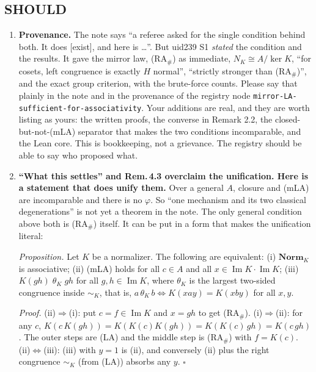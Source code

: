 \documentclass[11pt]{article}
\newcommand{\Norm}{\mathbf{Norm}}
\renewcommand{\Im}{\operatorname{Im}}
\begin{document}
\subsection*{SHOULD}
\begin{enumerate}[label=\textbf{S\arabic*.},leftmargin=*]
\item \textbf{Provenance.} The note says ``a referee asked for the single condition behind both. It does
  [exist], and here is \dots''. But uid239 S1 \emph{stated} the condition and the results. It gave the mirror law, (RA$_\#$)
  as immediate, $N_K\cong A/\ker K$, ``for cosets, left congruence is exactly $H$ normal'',
  ``strictly stronger than (RA$_\#$)'', and the exact group criterion, with the brute-force counts.
  Please say that plainly in the note and in the provenance of the registry node
  \texttt{mirror-LA-sufficient-for-associativity}. Your additions are real, and they are worth listing
  as yours: the written proofs, the converse in Remark 2.2, the closed-but-not-(mLA) separator that
  makes the two conditions incomparable, and the Lean core. This is bookkeeping, not a grievance. The
  registry should be able to say who proposed what.
\item \textbf{``What this settles'' and Rem.\,4.3 overclaim the unification. Here is a statement that
  does unify them.} Over a general $A$, closure and (mLA) are incomparable and there is no $\varphi$. So
  ``one mechanism and its two classical degenerations'' is not yet a theorem in the note. The only
  general condition above both is (RA$_\#$) itself. It can be put in a form that makes the
  unification literal:

  \emph{Proposition.} Let $K$ be a normalizer. The following are equivalent:
  (i) $\Norm_K$ is associative;
  (ii) (mLA) holds for all $c\in A$ and all $x\in\Im K\cdot\Im K$;
  (iii) $K(g h)\;\theta_K\;g h$ for all $g,h\in\Im K$, where $\theta_K$ is the largest two-sided congruence
  inside $\sim_K$, that is, $a\,\theta_K\,b\iff K(xay)=K(xby)$ for all $x,y$.

  \emph{Proof.} (ii)$\Rightarrow$(i): put $c=f\in\Im K$ and $x=gh$ to get (RA$_\#$). (i)$\Rightarrow$(ii): for any $c$,
  $K(c\,K(gh))=K(K(c)K(gh))=K(K(c)\,gh)=K(c\,gh)$. The outer steps are (LA) and the middle step is
  (RA$_\#$) with $f=K(c)$. (ii)$\Leftrightarrow$(iii): (iii) with $y=1$ is (ii), and conversely (ii) plus the right congruence
  $\sim_K$ (from (LA)) absorbs any $y$. $\square$


\end{enumerate}
\end{document}
